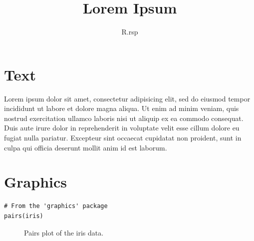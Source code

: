 \documentclass{article}
\title{Lorem Ipsum}
\author{R.rsp}
\begin{document}
\maketitle


\section{Text}

Lorem ipsum dolor sit amet, consectetur adipisicing elit, sed do eiusmod tempor incididunt ut labore et dolore magna aliqua. Ut enim ad minim veniam, quis nostrud exercitation ullamco laboris nisi ut aliquip ex ea commodo consequat. Duis aute irure dolor in reprehenderit in voluptate velit esse cillum dolore eu fugiat nulla pariatur. Excepteur sint occaecat cupidatat non proident, sunt in culpa qui officia deserunt mollit anim id est laborum.


\section{Graphics}

\begin{verbatim}
# From the 'graphics' package
pairs(iris)
\end{verbatim}
\begin{figure}[htbp]
 \begin{center}
  \caption{Pairs plot of the iris data.}
 \end{center}
\end{figure}
\end{document}
